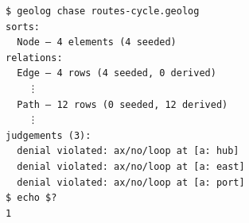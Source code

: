 \begin{Verbatim}[fontsize=\small,frame=leftline,rulecolor=\color{accentmid},framesep=3mm,xleftmargin=3mm]
$ geolog chase routes-cycle.geolog
sorts:
  Node — 4 elements (4 seeded)
relations:
  Edge — 4 rows (4 seeded, 0 derived)
    ⋮
  Path — 12 rows (0 seeded, 12 derived)
    ⋮
judgements (3):
  denial violated: ax/no/loop at [a: hub]
  denial violated: ax/no/loop at [a: east]
  denial violated: ax/no/loop at [a: port]
$ echo $?
1
\end{Verbatim}
